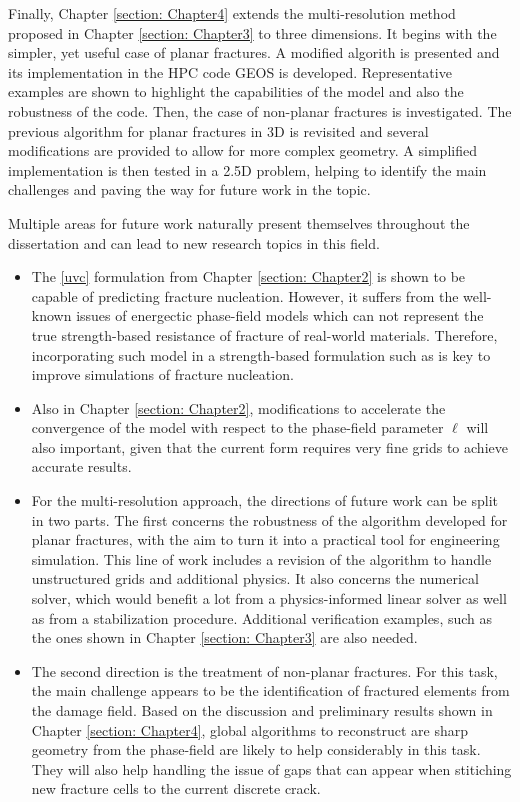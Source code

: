Finally, Chapter \ref{section: Chapter4} extends the multi-resolution method proposed in Chapter \ref{section: Chapter3} to three dimensions. It begins with the simpler, yet useful case of planar fractures. A modified algorith is presented and its implementation in the HPC code GEOS is developed. Representative examples are shown to highlight the capabilities of the model and also the robustness of the code. Then, the case of non-planar fractures is investigated. The previous algorithm for planar fractures in 3D is revisited and several modifications are provided to allow for more complex geometry. A simplified implementation is then tested in a 2.5D problem, helping to identify the main challenges and paving the way for future work in the topic.

Multiple areas for future work naturally present themselves throughout the dissertation and can lead to new research topics in this field.

\begin{itemize}
    \item The \eqref{uvc} formulation from Chapter \ref{section: Chapter2} is shown to be capable of predicting fracture nucleation. However, it suffers from the well-known issues of energectic phase-field models which can not represent the true strength-based resistance of fracture of real-world materials. Therefore, incorporating such model in a strength-based formulation such as \cite{kumar2020revisiting} is key to improve simulations of fracture nucleation. 
    
    \item Also in Chapter \ref{section: Chapter2}, modifications to accelerate the convergence of the model with respect to the phase-field parameter $\ell$ will also important, given that the current form requires very fine grids to achieve accurate results.
    
    \item For the multi-resolution approach, the directions of future work can be split in two parts. The first concerns the robustness of the algorithm developed for planar fractures, with the aim to turn it into a practical tool for engineering simulation. This line of work includes a revision of the algorithm to handle unstructured grids and additional physics. It also concerns the numerical solver, which would benefit a lot from a physics-informed linear solver as well as from a stabilization procedure. Additional verification examples, such as the ones shown in Chapter \ref{section: Chapter3} are also needed.
    
    \item The second direction is the treatment of non-planar fractures. For this task, the main challenge appears to be the identification of fractured elements from the damage field. Based on the discussion and preliminary results shown in Chapter \ref{section: Chapter4}, global algorithms to reconstruct are sharp geometry from the phase-field are likely to help considerably in this task. They will also help handling the issue of gaps that can appear when stitiching new fracture cells to the current discrete crack. 
\end{itemize}

